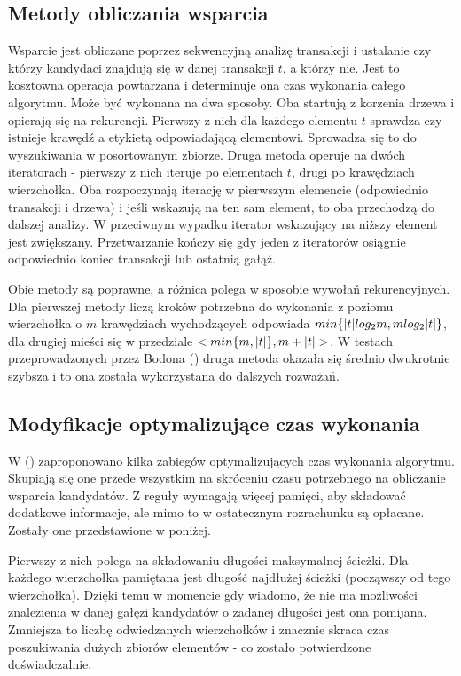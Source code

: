 \subsection*{Metody obliczania wsparcia}
Wsparcie jest obliczane poprzez sekwencyjną analizę transakcji i ustalanie czy którzy kandydaci znajdują się w danej transakcji \(t\), a którzy nie. Jest to kosztowna operacja powtarzana i determinuje ona czas wykonania całego algorytmu. Może być wykonana na dwa sposoby. Oba startują z korzenia drzewa i opierają się na rekurencji. Pierwszy z nich dla każdego elementu \(t\) sprawdza czy istnieje krawędź a etykietą odpowiadającą elementowi. Sprowadza się to do wyszukiwania w posortowanym zbiorze. Druga metoda operuje na dwóch iteratorach - pierwszy z nich iteruje po elementach \(t\), drugi po krawędziach wierzchołka. Oba rozpoczynają iterację w pierwszym elemencie (odpowiednio transakcji i drzewa) i jeśli wskazują na ten sam element, to oba przechodzą do dalszej analizy. W przeciwnym wypadku iterator wskazujący na niższy element jest zwiększany. Przetwarzanie kończy się gdy jeden z iteratorów osiągnie odpowiednio koniec transakcji lub ostatnią gałąź.

Obie metody są poprawne, a różnica polega w sposobie wywołań rekurencyjnych. Dla pierwszej metody liczą kroków potrzebna do wykonania z poziomu wierzchołka o \(m\) krawędziach wychodzących odpowiada \(min\{|t| log_2{m},\nolinebreak m\nolinebreak log_2{|t|}\}\), dla drugiej mieści się w przedziale \(<min\{m,\nolinebreak|t|\},\nolinebreak m\nolinebreak+\nolinebreak|t|>\). W testach przeprowadzonych przez Bodona (\cite{Bodon}) druga metoda okazała się średnio dwukrotnie szybsza i to ona została wykorzystana do dalszych rozważań.

\subsection*{Modyfikacje optymalizujące czas wykonania}
W (\cite{Bodon}) zaproponowano kilka zabiegów optymalizujących czas wykonania algorytmu. Skupiają się one przede wszystkim na skróceniu czasu potrzebnego na obliczanie wsparcia kandydatów. Z reguły wymagają więcej pamięci, aby składować dodatkowe informacje, ale mimo to w ostatecznym rozrachunku są opłacane. Zostały one przedstawione w poniżej.

Pierwszy z nich polega na składowaniu długości maksymalnej ścieżki. Dla każdego wierzchołka pamiętana jest długość najdłużej ścieżki (począwszy od tego wierzchołka). Dzięki temu w momencie gdy wiadomo, że nie ma możliwości znalezienia w danej gałęzi kandydatów o zadanej długości jest ona pomijana. Zmniejsza to liczbę odwiedzanych wierzchołków i znacznie skraca czas poszukiwania dużych zbiorów elementów - co zostało potwierdzone doświadczalnie.

